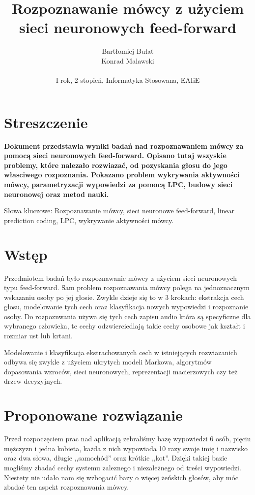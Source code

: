 \documentclass[a4paper]{article}
\title{Rozpoznawanie mówcy z użyciem sieci neuronowych feed-forward}
\author{
Bartłomiej Bułat\\
Konrad Malawski\\
\\
I rok, 2 stopień, Informatyka Stosowana, EAIiE}
\begin{document}
\maketitle

\section{Streszczenie}

\textbf{
Dokument przedstawia wyniki badań nad rozpoznawaniem mówcy za pomocą sieci
neuronowych feed-forward. Opisano tutaj wszyskie problemy, które nalezało
rozwiazać, od pozyskania głosu do jego własciwego rozpoznania. Pokazano problem
wykrywania aktywności mówcy, parametryzacji wypowiedzi za pomocą LPC, budowy 
sieci neuronowej oraz metod nauki.}

Słowa kluczowe: Rozpoznawanie mówcy, sieci neuronowe feed-forward, linear prediction 
coding, LPC, wykrywanie aktywności mówcy.

\section{Wstęp}

Przedmiotem badań było rozpoznawanie mówcy z użyciem sieci neuronowych typu
feed-forward. Sam problem rozpoznawania mówcy polega na jednoznacznym wskazaniu
osoby po jej głosie. Zwykle dzieje się to w 3 krokach: ekstrakcja cech głosu,
modelowanie tych cech oraz klasyfikacja nowych wypowiedzi i rozpoznanie osoby.
Do rozpoznwania używa się tych cech zapisu audio która są specyficzne dla
wybranego człowieka, te cechy odzwierciedlają takie cechy osobowe jak kształt
i rozmiar ust lub krtani.

Modelowanie i klasyfikacja ekstrachowanych cech w istniejących rozwiazanich
odbywa się zwykle z użyciem ukrytych modeli Markowa, algorytmów dopasowania
wzroców, sieci neuronowych, reprezentacji macierzowych czy też drzew
decyzyjnych.

\section{Proponowane rozwiązanie}

Przed rozpoczęciem prac nad aplikacją zebraliśmy bazę wypowiedzi 6 osób, pięciu
mężczyzn i jedna kobieta, każda
z nich wypowiada 10 razy swoje imię i nazwisko oraz dwa słowa, długie
,,samochód'' oraz krótkie ,,kot''. Dzięki takiej bazie mogliśmy zbadać cechy
systemu zaleznego i niezależnego od treści wypowiedzi. Niestety nie udało nam
się wzbogacić bazy o więcej żeńskich głosów, aby móc zbadać ten aspekt
rozpoznawania mówcy.
\end{document}
